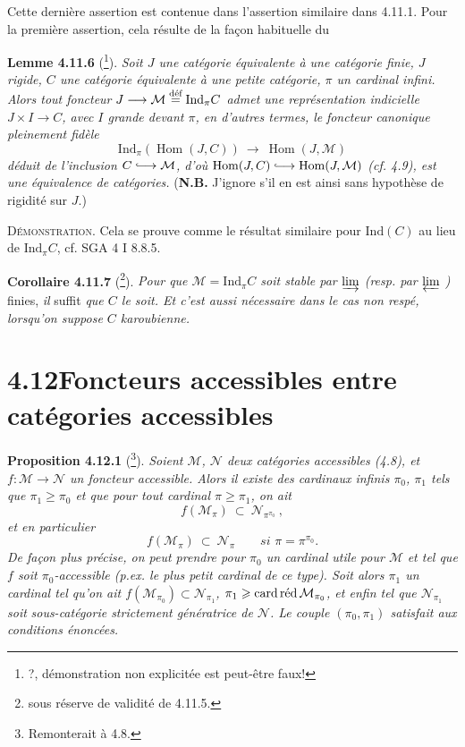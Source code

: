 \documentclass[11pt]{article}
\newcommand{\printedpage}[1]{\marginpar{\footnotesize p.~#1}}
\newcommand{\msp}[1]{\marginpar{\footnotesize [#1]}}
\newcommand{\Ind}{\mathrm{Ind}}
\newcommand{\cardred}{\mathop{\textup{card\,réd}}\nolimits}
\newcommand{\Hom}{\operatorname{Hom}}
\newcommand{\defeq}{\overset{\text{\upshape déf}}{=}}
\newcommand{\into}{\lhook\joinrel\longrightarrow}
\begin{document}
Cette dernière assertion est contenue dans l'assertion similaire dans 4.11.1. Pour la première assertion, cela résulte de la façon habituelle du

\textbf{Lemme 4.11.6} (\footnote{?, démonstration non explicitée est peut-être faux!}). \textit{Soit $J$ une catégorie équivalente à une catégorie finie, $J$ rigide, $C$ une catégorie équivalente à une petite catégorie, $\pi$ un cardinal infini. Alors tout foncteur}
\printedpage{102}
\textit{$J \longrightarrow \mathcal{M} \defeq \Ind_\pi C$ admet une représentation indicielle $J \times I \longrightarrow C$, avec $I$ grande devant $\pi$, en d'autres termes, le} \msp{page 272} \textit{foncteur canonique pleinement fidèle}
\[
\Ind_\pi(\Hom(J,C)) \ \longrightarrow \ \Hom(J,\mathcal{M})
\]
\textit{déduit de l'inclusion $C \into \mathcal{M}$, d'où $\Hom(J,C) \into \Hom(J,\mathcal{M})$ (cf. 4.9), est une équivalence de catégories.} (\textbf{N.B.} J'ignore s'il en est ainsi sans hypothèse de rigidité sur $J$.)

\textsc{Démonstration}. Cela se prouve comme le résultat similaire pour $\Ind(C)$ au lieu de $\Ind_\pi C$, cf. SGA 4 I 8.8.5.

\msp{page 273}

\textbf{Corollaire 4.11.7} (\footnote{sous réserve de validité de 4.11.5.}). \textit{Pour que $\mathcal{M} = \Ind_\pi C$ soit stable par $\varinjlim$ (resp. par $\varprojlim$ )} finies, \textit{il} suffit \textit{que $C$ le soit. Et c'est aussi nécessaire dans le cas non respé, lorsqu'on suppose $C$ karoubienne.}

\section*{4.12\quad Foncteurs accessibles entre catégories accessibles}

\textbf{Proposition 4.12.1} (\footnote{Remonterait à 4.8.}). \textit{Soient $\mathcal{M}$, $\mathcal{N}$ deux catégories accessibles (4.8), et $f : \mathcal{M} \longrightarrow \mathcal{N}$ un foncteur accessible. Alors il existe des cardinaux infinis $\pi_0$, $\pi_1$ tels que $\pi_1 \geqslant \pi_0$ et que pour tout cardinal $\pi \geqslant \pi_1$, on ait}
\[
f(\mathcal{M}_\pi) \ \subset \ \mathcal{N}_{\pi^{\pi_0}} \ , \tag*{(4.12.1)} %
\]
\textit{et en particulier}
\[
f(\mathcal{M}_\pi) \ \subset \ \mathcal{N}_\pi \qquad \textit{si } \pi = \pi^{\pi_0}. \tag*{(4.12.1.2)}
\]
\textit{De façon plus précise, on peut prendre pour $\pi_0$ un cardinal utile pour $\mathcal{M}$} \msp{page 274} \textit{et tel que $f$ soit $\pi_0$-accessible (p.ex. le plus petit cardinal de ce type). Soit alors $\pi_1$ un cardinal tel qu'on ait $f(\mathcal{M}_{\pi_0}) \subset \mathcal{N}_{\pi_1}$, $\pi_1 \geqslant \cardred \mathcal{M}_{\pi_0}$, et enfin tel que $\mathcal{N}_{\pi_1}$ soit} \textit{sous-catégorie strictement génératrice de $\mathcal{N}$. Le couple $(\pi_0,\pi_1)$ satisfait aux conditions énoncées.}
\end{document}
